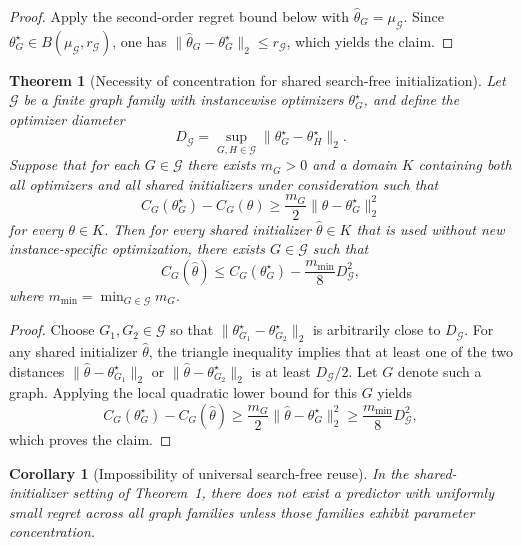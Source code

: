 \documentclass[
  reprint,
  twocolumn,
  aps,
  superscriptaddress,
  longbibliography,
  floatfix
]{revtex4-2}
\newtheorem{theorem}{Theorem}
\newtheorem{corollary}{Corollary}
\begin{document}
\begin{proof}
Apply the second-order regret bound below with $\hat\theta_G = \mu_{\mathcal{G}}$. Since $\theta_G^\star \in B(\mu_{\mathcal{G}}, r_{\mathcal{G}})$, one has $\|\hat\theta_G - \theta_G^\star\|_2 \le r_{\mathcal{G}}$, which yields the claim.
\end{proof}

\begin{theorem}[Necessity of concentration for shared search-free initialization]
Let $\mathcal{G}$ be a finite graph family with instancewise optimizers $\theta_G^\star$, and define the optimizer diameter
\begin{equation}
D_{\mathcal{G}} = \sup_{G,H\in\mathcal{G}} \|\theta_G^\star - \theta_H^\star\|_2.
\end{equation}
Suppose that for each $G\in\mathcal{G}$ there exists $m_G>0$ and a domain $K$ containing both all optimizers and all shared initializers under consideration such that
\begin{equation}
C_G(\theta_G^\star) - C_G(\theta) \ge \frac{m_G}{2}\|\theta-\theta_G^\star\|_2^2
\end{equation}
for every $\theta\in K$. Then for every shared initializer $\hat\theta\in K$ that is used without new instance-specific optimization, there exists $G\in\mathcal{G}$ such that
\begin{equation}
C_G(\hat\theta) \le C_G(\theta_G^\star) - \frac{m_{\min}}{8}D_{\mathcal{G}}^2,
\end{equation}
where $m_{\min}=\min_{G\in\mathcal{G}} m_G$.
\end{theorem}

\begin{proof}
Choose $G_1,G_2\in\mathcal{G}$ so that $\|\theta_{G_1}^\star-\theta_{G_2}^\star\|_2$ is arbitrarily close to $D_{\mathcal{G}}$. For any shared initializer $\hat\theta$, the triangle inequality implies that at least one of the two distances $\|\hat\theta-\theta_{G_1}^\star\|_2$ or $\|\hat\theta-\theta_{G_2}^\star\|_2$ is at least $D_{\mathcal{G}}/2$. Let $G$ denote such a graph. Applying the local quadratic lower bound for this $G$ yields
\begin{equation}
C_G(\theta_G^\star)-C_G(\hat\theta) \ge \frac{m_G}{2}\|\hat\theta-\theta_G^\star\|_2^2 \ge \frac{m_{\min}}{8}D_{\mathcal{G}}^2,
\end{equation}
which proves the claim.
\end{proof}

\begin{corollary}[Impossibility of universal search-free reuse]
In the shared-initializer setting of Theorem~1, there does not exist a predictor with uniformly small regret across all graph families unless those families exhibit parameter concentration.
\end{corollary}
\end{document}
